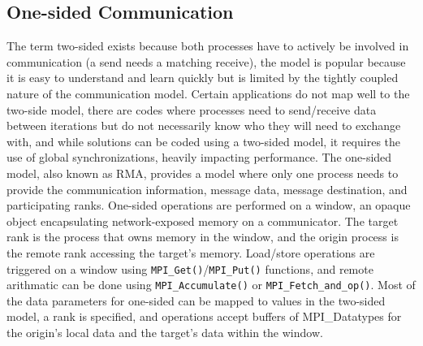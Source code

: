 \subsection{One-sided Communication}
The term two-sided exists because both processes have to actively be involved in communication (a send needs a matching receive), the model is popular because it is easy to understand and learn quickly but is limited by the tightly coupled nature of the communication model.
Certain applications do not map well to the two-side model, there are codes where processes need to send/receive data between iterations but do not necessarily know who they will need to exchange with, and while solutions can be coded using a two-sided model, it requires the use of global synchronizations, heavily impacting performance.
The one-sided model, also known as \gls{RMA}, provides a model where only one process needs to provide the communication information, message data, message destination, and participating ranks.
One-sided operations are performed on a window, an opaque object encapsulating network-exposed memory on a communicator.
The target rank is the process that owns memory in the window, and the origin process is the remote rank accessing the target's memory.
Load/store operations are triggered on a window using \texttt{MPI\_Get()}/\texttt{MPI\_Put()} functions, and remote arithmatic can be done using \texttt{MPI\_Accumulate()} or \texttt{MPI\_Fetch\_and\_op()}.
Most of the data parameters for one-sided can be mapped to values in the two-sided model, a rank is specified, and operations accept buffers of MPI\_Datatypes for the origin's local data and the target's data within the window.

